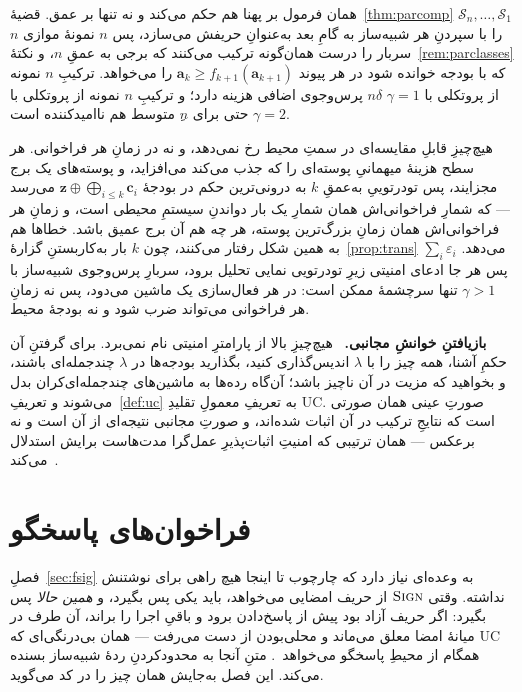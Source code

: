 \documentclass[10pt,oneside,openany]{book}
\newcommand{\Sim}{\mathcal{S}}
\newcommand{\bd}[1]{\mathbf{#1}}
\newcommand{\op}[1]{\textnormal{\textsc{#1}}}
\newcommand{\heading}[1]{\medskip\par\noindent\textcolor{accent}{\textbf{#1.}}\ }
\theoremstyle{accentdef}
\theoremstyle{accentplain}
\begin{document}
همان فرمول بر پهنا هم حکم می‌کند و نه تنها بر عمق.
قضیهٔ~\ref{thm:parcomp} $\Sim_n,\dots,\Sim_1$ را با سپردنِ هر شبیه‌ساز به
گامِ بعد به‌عنوانِ حریفش می‌سازد، پس $n$ نمونهٔ موازی $n$ سربار را درست
همان‌گونه ترکیب می‌کنند که برجی به عمقِ $n$، و
نکتهٔ~\ref{rem:parclasses} که با بودجه خوانده شود در هر پیوند $\bd{a}_k
\geq f_{k+1}(\bd{a}_{k+1})$ را می‌خواهد. ترکیبِ $n$ نمونه از پروتکلی با
$\gamma = 1$ $n\delta$ پرس‌وجوی اضافی هزینه دارد؛ و ترکیبِ $n$ نمونه از
پروتکلی با $\gamma = 2$ حتی برای $n$ِ متوسط هم ناامیدکننده است.

هیچ‌چیزِ قابلِ مقایسه‌ای در سمتِ محیط رخ نمی‌دهد، و نه در زمانِ هر فراخوانی.
هر سطح هزینهٔ میهمانیِ پوسته‌ای را که جذب می‌کند می‌افزاید، و پوسته‌های یک برج
مجزایند، پس تو‌درتوییِ به‌عمقِ $k$ به درونی‌ترین حکم در بودجهٔ $\bd{z} \oplus
\bigoplus_{i \leq k} \bd{c}_i$ می‌رسد --- که شمارِ فراخوانی‌اش همان شمارِ
یک بار دواندنِ سیستمِ محیطی است، و زمانِ هر فراخوانی‌اش همان زمانِ
بزرگ‌ترین پوسته، هر چه هم آن برج عمیق باشد. خطاها هم به همین شکل رفتار
می‌کنند، چون $k$ بار به‌کاربستنِ گزارهٔ~\ref{prop:trans} $\sum_i
\varepsilon_i$ می‌دهد. پس هر جا ادعای امنیتی زیرِ تو‌درتویی نمایی تحلیل
برود، سربارِ پرس‌وجوی شبیه‌ساز با $\gamma > 1$ تنها سرچشمهٔ ممکن است: در هر
فعال‌سازی یک ماشین می‌دود، پس نه زمانِ هر فراخوانی می‌تواند ضرب شود و نه
بودجهٔ محیط.

\heading{بازیافتنِ خوانشِ مجانبی} هیچ‌چیزِ بالا از پارامترِ امنیتی نام
نمی‌برد. برای گرفتنِ آن حکمِ آشنا، همه چیز را با $\lambda$ اندیس‌گذاری کنید،
بگذارید بودجه‌ها در $\lambda$ چندجمله‌ای باشند، و بخواهید که مزیت در آن
ناچیز باشد؛ آن‌گاه رده‌ها به ماشین‌های چندجمله‌ای‌کران بدل می‌شوند و
تعریفِ~\ref{def:uc} به تعریفِ معمولِ تقلیدِ UC. صورتِ عینی همان صورتی است
که نتایجِ ترکیب در آن اثبات شده‌اند، و صورتِ مجانبی نتیجه‌ای از آن است و نه
برعکس --- همان ترتیبی که امنیتِ اثبات‌پذیرِ عمل‌گرا مدت‌هاست برایش استدلال
می‌کند~\cite{Bellare97}.

\chapter{فراخوان‌های پاسخگو}\label{app:responsive}

فصلِ~\ref{sec:fsig} به وعده‌ای نیاز دارد که چارچوب تا اینجا هیچ راهی برای
نوشتنش نداشته. وقتی $\op{Sign}$ از حریف امضایی می‌خواهد، باید یکی پس
بگیرد، و \emph{همین حالا} پس بگیرد: اگر حریف آزاد بود پیش از پاسخ‌دادن برود
و باقیِ اجرا را براند، آن طرف در میانهٔ امضا معلق می‌ماند و محلی‌بودن از دست
می‌رفت --- همان بی‌درنگی‌ای که UCِ همگام از محیطِ پاسخگو
می‌خواهد~\cite{KMTZ13}. متنِ آنجا به محدودکردنِ ردهٔ شبیه‌ساز بسنده می‌کند.
این فصل به‌جایش همان چیز را در کد می‌گوید.
\end{document}
